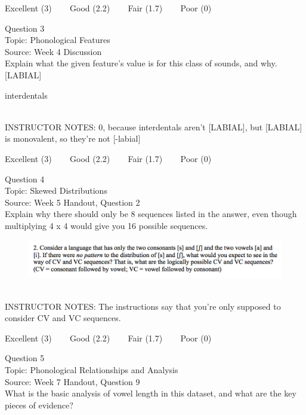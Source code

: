 \documentclass[12pt]{article}
\begin{document}
\vfill
Excellent (3) ~~~ Good (2.2) ~~~ Fair (1.7) ~~~ Poor (0)
\newpage

{\large Question 3}\\

Topic: Phonological Features\\
Source: Week 4 Discussion\\

Explain what the given feature’s value is for this class of sounds, and why.\\

{[LABIAL]}

interdentals


~\\
INSTRUCTOR NOTES: 0, because interdentals aren't [LABIAL], but [LABIAL] is monovalent, so they're not [-labial]


\vfill
Excellent (3) ~~~ Good (2.2) ~~~ Fair (1.7) ~~~ Poor (0)
\newpage

{\large Question 4}\\

Topic: Skewed Distributions\\
Source: Week 5 Handout, Question 2\\

Explain why there should only be 8 sequences listed in the answer, even though multiplying 4 x 4 would give you 16 possible sequences.\\

\begin{figure}[H]
\includegraphics{../images/skew2.png}
\end{figure}

~\\
INSTRUCTOR NOTES: The instructions say that you're only supposed to consider CV and VC sequences. 


\vfill
Excellent (3) ~~~ Good (2.2) ~~~ Fair (1.7) ~~~ Poor (0)
\newpage

{\large Question 5}\\

Topic: Phonological Relationships and Analysis\\
Source: Week 7 Handout, Question 9\\

What is the basic analysis of vowel length in this dataset, and what are the key pieces of evidence?\\
\end{document}
